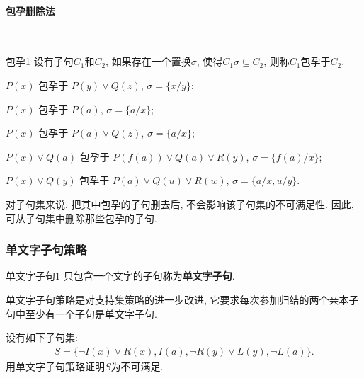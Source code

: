 \paragraph{包孕删除法}~{}
\begin{mydef}{包孕}{1}
    设有子句$C_1$和$C_2$, 如果存在一个置换$\sigma $, 使得$C_1\sigma \subseteq C_2$, 则称$C_1$包孕于$C_2$.
\end{mydef}
\begin{example}
    $P(x)$             包孕于   $P(y)\vee Q(z)$,             $\sigma =\{x/y\}$;

    $P(x)$             包孕于   $P(a)$,                      $\sigma =\{a/x\}$;

    $P(x)$             包孕于   $P(a)\vee Q(z)$,             $\sigma =\{a/x\}$;

    $P(x) \vee Q(a)$ 包孕于 $P(f(a))\vee Q(a)\vee R(y)$,    $\sigma =\{f(a)/x\}$;

    $P(x) \vee Q(y)$ 包孕于 $P(a)\vee Q(u)\vee R(w)$,        $\sigma =\{a/x, u/y\}$.
\end{example}

对子句集来说, 把其中包孕的子句删去后, 不会影响该子句集的不可满足性. 因此, 可从子句集中删除那些包孕的子句.
\subsubsection{单文字子句策略}
\begin{mydef}{单文字子句}{1}
    只包含一个文字的子句称为\textbf{单文字子句}.
\end{mydef}
单文字子句策略是对支持集策略的进一步改进, 它要求每次参加归结的两个亲本子句中至少有一个子句是单文字子句.
\begin{example}
    设有如下子句集:
\begin{align}
    S=\{\neg I(x)\vee R(x),  I(a), \neg R(y)\vee L(y), \neg L(a)\}.
\end{align}
用单文字子句策略证明$S$为不可满足.
\end{example}

